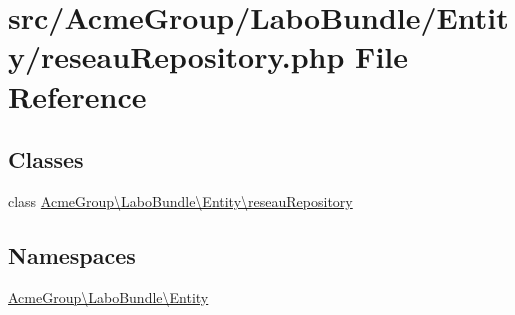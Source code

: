 \hypertarget{reseau_repository_8php}{\section{src/\+Acme\+Group/\+Labo\+Bundle/\+Entity/reseau\+Repository.php File Reference}
\label{reseau_repository_8php}
}
\subsection*{Classes}
\begin{DoxyCompactItemize}
\item 
class \hyperlink{class_acme_group_1_1_labo_bundle_1_1_entity_1_1reseau_repository}{Acme\+Group\textbackslash{}\+Labo\+Bundle\textbackslash{}\+Entity\textbackslash{}reseau\+Repository}
\end{DoxyCompactItemize}
\subsection*{Namespaces}
\begin{DoxyCompactItemize}
\item 
 \hyperlink{namespace_acme_group_1_1_labo_bundle_1_1_entity}{Acme\+Group\textbackslash{}\+Labo\+Bundle\textbackslash{}\+Entity}
\end{DoxyCompactItemize}
